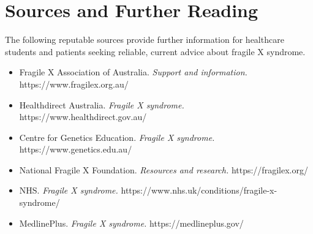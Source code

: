 \section*{Sources and Further Reading}
The following reputable sources provide further information for healthcare students and patients seeking reliable, current advice about fragile X syndrome.
\begin{itemize}
    \item Fragile X Association of Australia. \textit{Support and information.} https://www.fragilex.org.au/
    \item Healthdirect Australia. \textit{Fragile X syndrome.} https://www.healthdirect.gov.au/
    \item Centre for Genetics Education. \textit{Fragile X syndrome.} https://www.genetics.edu.au/
    \item National Fragile X Foundation. \textit{Resources and research.} https://fragilex.org/
    \item NHS. \textit{Fragile X syndrome.} https://www.nhs.uk/conditions/fragile-x-syndrome/
    \item MedlinePlus. \textit{Fragile X syndrome.} https://medlineplus.gov/
\end{itemize}
